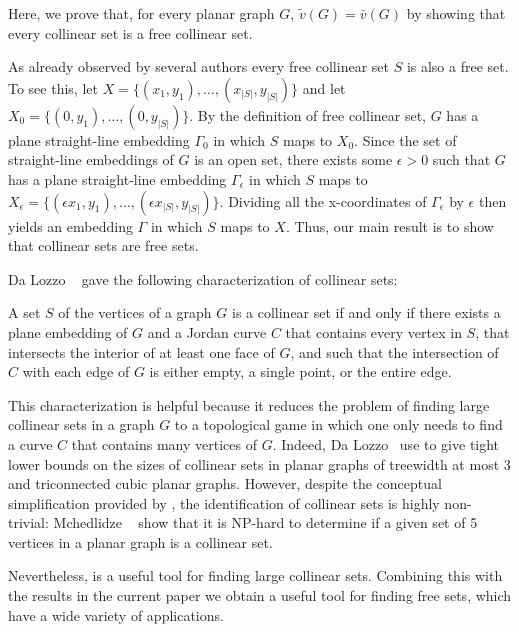 \documentclass{patmorin}
\begin{document}
 Here, we prove that, for every planar graph $G$,
$\tilde{v}(G)=\bar{v}(G)$ by showing that every collinear set is a free
collinear set.

As already observed by several authors \cite{X} every
free collinear set $S$ is also a free set. To see this,
let $X=\{(x_1,y_1),\ldots,(x_{|S|},y_{|S|})\}$ and let
$X_0=\{(0,y_1),\ldots,(0,y_{|S|})\}$.  By the definition of free
collinear set, $G$ has a plane straight-line embedding $\Gamma_0$ in
which $S$ maps to $X_0$.  Since the set of straight-line embeddings of
$G$ is an open set, there exists some $\epsilon >0$ such that $G$ has a
plane straight-line embedding $\Gamma_{\epsilon}$ in which $S$ maps to
$X_\epsilon=\{(\epsilon x_1,y_1),\ldots,(\epsilon x_{|S|},y_{|S|})\}$.
Dividing all the x-coordinates of $\Gamma_\epsilon$ by $\epsilon$ then
yields an embedding $\Gamma$ in which $S$ maps to $X$. Thus, our main
result is to show that collinear sets are free sets.

Da Lozzo \etal\ \cite{dalozzo.dujmovic.ea:drawing} gave the following
characterization of collinear sets:

\begin{thm}
   A set $S$ of the vertices of a graph $G$ is a collinear set if and
   only if there exists a plane embedding of $G$ and a Jordan curve $C$
   that contains every vertex in $S$, that intersects the interior of
   at least one face of $G$, and such that the intersection of $C$ with
   each edge of $G$ is either empty, a single point, or the entire edge.
\end{thm}

This characterization is helpful because it reduces the problem of
finding large collinear sets in a graph $G$ to a topological game in
which one only needs to find a curve $C$ that contains many vertices
of $G$.  Indeed, Da Lozzo \etal\ use  to give
tight lower bounds on the sizes of collinear sets in planar graphs
of treewidth at most 3 and triconnected cubic planar graphs.  However,
despite the conceptual simplification provided by ,
the identification of collinear sets is highly non-trivial:  Mchedlidze
\etal\ \cite{mchedlidze.radermacher.ea:aligned} show that it is NP-hard to
determine if a given set of 5 vertices in a planar graph is a collinear
set.

Nevertheless,  is a useful tool for finding large 
collinear
sets. Combining this with the results in the current paper we obtain
a useful tool for finding free sets, which have a wide variety of
applications.
\end{document}
